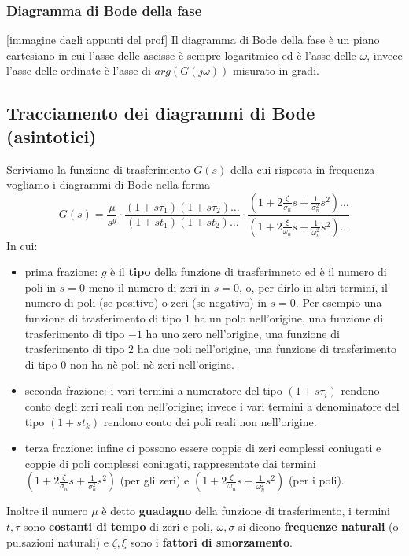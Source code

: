 \subsubsection{Diagramma di Bode della fase}
[immagine dagli appunti del prof]\newline
\newline
Il diagramma di Bode della fase è un piano cartesiano in cui l'asse delle ascisse è sempre logaritmico ed è l'asse delle $\omega$, invece l'asse delle ordinate è l'asse di $arg(G(j \omega))$ misurato in gradi.
\subsection{Tracciamento dei diagrammi di Bode (asintotici)}
Scriviamo la funzione di trasferimento $G(s)$ della cui risposta in frequenza vogliamo i diagrammi di Bode nella forma 
\[
    G(s) = \frac{\mu}{s^g} \cdot \frac{(1 + s \tau_1)(1 + s \tau_2)\dots}{(1 + s t_1)(1 + s t_2)\dots} \cdot \frac{(1 + 2 \frac{\zeta}{\sigma_n}s + \frac{1}{\sigma_n^2}s^2)\dots}{(1 + 2 \frac{\xi}{\omega_n} s + \frac{1}{\omega_n^2}s^2)\dots}
\]
In cui:
\begin{itemize}
    \item prima frazione: $g$ è il \textbf{tipo} della funzione di trasferimneto ed è il numero di poli in $s=0$ meno il numero di zeri in $s=0$, o, per dirlo in altri termini, il numero di poli (se positivo) o zeri (se negativo) in $s=0$.\newline
    Per esempio una funzione di trasferimento di tipo $1$ ha un polo nell'origine, una funzione di trasferimento di tipo $-1$ ha uno zero nell'origine, una funzione di trasferimento di tipo $2$ ha due poli nell'origine, una funzione di trasferimento di tipo $0$ non ha nè poli nè zeri nell'origine.
    \item seconda frazione: i vari termini a numeratore del tipo $(1 + s \tau_i)$ rendono conto degli zeri reali non nell'origine; invece i vari termini a denominatore del tipo $(1 + s t_k)$ rendono conto dei poli reali non nell'origine.
    \item terza frazione: infine ci possono essere coppie di zeri complessi coniugati e coppie di poli complessi coniugati, rappresentate dai termini $(1 + 2 \frac{\zeta}{\sigma_n}s + \frac{1}{\sigma_n^2}s^2)$ (per gli zeri) e $(1 + 2 \frac{\xi}{\omega_n} s + \frac{1}{\omega_n^2}s^2)$ (per i poli).
\end{itemize}
Inoltre il numero $\mu$ è detto \textbf{guadagno} della funzione di trasferimento, i termini $t, \tau$ sono \textbf{costanti di tempo} di zeri e poli,  $\omega, \sigma$ si dicono \textbf{frequenze naturali} (o pulsazioni naturali) e $\zeta, \xi$ sono i \textbf{fattori di smorzamento}.\newline
